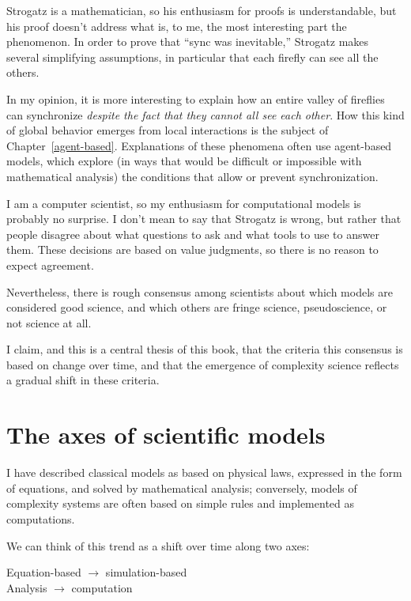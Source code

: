 \documentclass[10pt]{book}
\begin{document}
Strogatz is a mathematician, so his enthusiasm for proofs is
understandable, but his proof doesn't address what is, to me, the
most interesting part the phenomenon.  In order to prove that ``sync
was inevitable,'' Strogatz makes several simplifying assumptions, in
particular that each firefly can see all the others.

In my opinion, it is more interesting to explain how an entire valley
of fireflies can synchronize {\em despite the fact that they cannot
  all see each other}.  How this kind of global behavior emerges from
local interactions is the subject of Chapter~\ref{agent-based}.
Explanations of these phenomena often use agent-based models, which
explore (in ways that would be difficult or impossible with
mathematical analysis) the conditions that allow or prevent
synchronization.

I am a computer scientist, so my enthusiasm for computational models
is probably no surprise.  I don't mean to say that Strogatz is wrong,
but rather that people disagree about what questions to ask and what
tools to use to answer them.  These decisions are based on value
judgments, so there is no reason to expect agreement.

Nevertheless, there is rough consensus among scientists
about which models are considered good science, and which others
are fringe science, pseudoscience, or not science at all.

I claim, and this is a central thesis of this book, that the
criteria this consensus is based on change over time, and that
the emergence of complexity science reflects a gradual shift in
these criteria.


\section{The axes of scientific models}

I have described classical models as based on physical laws, expressed
in the form of equations, and solved by mathematical analysis;
conversely, models of complexity systems are often based on simple
rules and implemented as computations.

We can think of this trend as a shift over time along two axes:

\begin{description}

\item[Equation-based $\rightarrow$ simulation-based] \quad

\item[Analysis $\rightarrow$ computation] \quad

\end{description}
\end{document}
